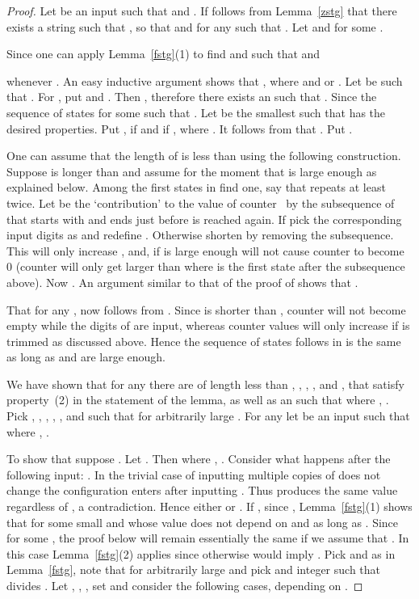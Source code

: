 \documentclass[12pt]{article}
\begin{document}
\begin{proof}
Let  be an input such that  and
. If follows from Lemma~\ref{zstg} that there
exists a string  such that ,  so that  and  
for any  such that . Let  and 
 for some
. 

Since  one can apply Lemma~\ref{fstg}(1) to
find  and  such that  and

whenever . An easy inductive argument shows that
,
where  and  or
. Let  be such that . For
  ,  put 
 and
. Then
, therefore there exists an
 such that . Since  the sequence of
states  for some
 such that . Let  be the
smallest such that  has the desired properties. Put
,
 if  and
 if , where . It follows from 
that . Put . 

One can assume that the length of  is less than  using
the following construction. Suppose  is longer than 
and assume for the moment that  is large enough as explained
below. Among the first  states in  find one, say  that
repeats at least twice. Let  be the `contribution' to the value
of counter~ by the
subsequence of  that starts with  and ends just before
 is reached again. If  pick the corresponding
input digits as  and redefine . Otherwise shorten
 by removing the subsequence. This will only increase ,
and, if  is large enough will not cause counter  to
become 0 (counter  will only get larger than  where  is
the first state after the subsequence above). Now .  
An argument similar to that of the proof of  shows that .

That  for any ,  now follows from . Since 
is shorter than , counter  will not become empty while the
digits of  are input, whereas counter  values will only
increase if  is trimmed as discussed above. Hence the
sequence of states  follows in  is the
same as long as  and  are large enough.

We have shown that for any  there are  of length less than , ,
, ,  and ,
 that satisfy property~(2) in the statement of
the lemma, as well as an  such that  where ,
. Pick , , , , , and  such
that 
for arbitrarily large . For any  let  be an input such that 
 where ,
.

To show that  suppose . Let
. Then  where ,
.  Consider what happens after the following input:
. In the trivial case of 
inputting multiple copies of  does not change the
configuration  enters after inputting . Thus  produces the
same value regardless of , a contradiction. Hence either  or
.  If , since ,
Lemma~\ref{fstg}(1) shows that  for some small  and  whose value does not depend
on  and  as long as . Since
 for some ,  the
proof below will remain essentially the same if we assume that
. In this case
Lemma~\ref{fstg}(2) applies since otherwise  would imply
. Pick  and  as in Lemma~\ref{fstg}, note
that  for
arbitrarily large  and pick and integer  such that 
divides .  Let , , , set
 and consider the following cases,
depending on .


\end{proof}
\end{document}
